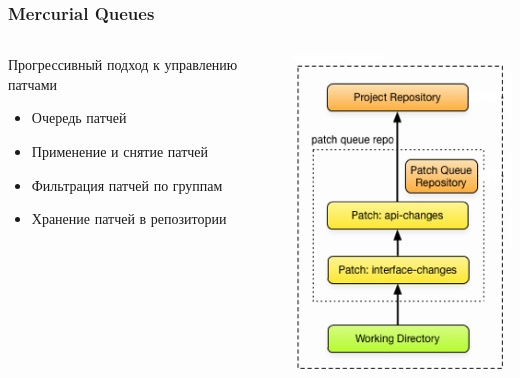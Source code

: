 \documentclass[unicode]{beamer}
\begin{document}
\begin{frame}
\transwipe[direction=90]
\frametitle{Mercurial Queues}
\begin{columns}
\begin{column}{0.65\textwidth}
\begin{block}{Прогрессивный подход к управлению патчами}
\begin{itemize}
  \item Очередь патчей
  \item Применение и снятие патчей
  \item Фильтрация патчей по группам
  \item Хранение патчей в репозитории
\end{itemize}
\end{block}
\end{column}
\begin{column}{0.35\textwidth}
\centerline{\includegraphics[width=1\textwidth]{mq-versioned.png}}
\end{column}
\end{columns}
\end{frame}
\end{document}
